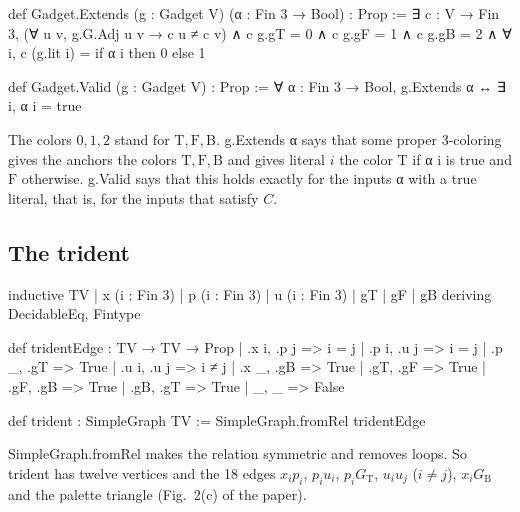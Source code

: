 \documentclass[11pt,a4paper]{article}
\newcommand{\leanus}{\textunderscore\allowbreak}
\newcommand{\lean}[1]{{\ttfamily\let\_\leanus #1}}
\newcommand{\GT}{G_{\mathrm{T}}}
\newcommand{\GB}{G_{\mathrm{B}}}
\newcommand{\T}{\mathrm{T}}
\newcommand{\F}{\mathrm{F}}
\newcommand{\B}{\mathrm{B}}
\begin{document}
\begin{code}
def Gadget.Extends (g : Gadget V) (α : Fin 3 → Bool) : Prop :=
  ∃ c : V → Fin 3, (∀ u v, g.G.Adj u v → c u ≠ c v) ∧
    c g.gT = 0 ∧ c g.gF = 1 ∧ c g.gB = 2 ∧
    ∀ i, c (g.lit i) = if α i then 0 else 1

def Gadget.Valid (g : Gadget V) : Prop :=
  ∀ α : Fin 3 → Bool, g.Extends α ↔ ∃ i, α i = true
\end{code}
The colors $0,1,2$ stand for $\T,\F,\B$. \lean{g.Extends α} says that some
proper 3-coloring gives the anchors the colors $\T,\F,\B$ and gives literal
$i$ the color $\T$ if \lean{α i} is true and $\F$ otherwise. \lean{g.Valid}
says that this holds exactly for the inputs \lean{α} with a true literal,
that is, for the inputs that satisfy $C$.

\subsection{The trident}
\begin{code}
inductive TV
  | x (i : Fin 3)
  | p (i : Fin 3)
  | u (i : Fin 3)
  | gT
  | gF
  | gB
  deriving DecidableEq, Fintype

def tridentEdge : TV → TV → Prop
  | .x i, .p j => i = j
  | .p i, .u j => i = j
  | .p _, .gT => True
  | .u i, .u j => i ≠ j
  | .x _, .gB => True
  | .gT, .gF => True
  | .gF, .gB => True
  | .gB, .gT => True
  | _, _ => False

def trident : SimpleGraph TV := SimpleGraph.fromRel tridentEdge
\end{code}
\lean{SimpleGraph.fromRel} makes the relation symmetric and removes loops.
So \lean{trident} has twelve vertices and the 18 edges $x_ip_i$, $p_iu_i$,
$p_i\GT$, $u_iu_j$ ($i\ne j$), $x_i\GB$ and the palette triangle
(Fig.~2(c) of the paper).
\end{document}
